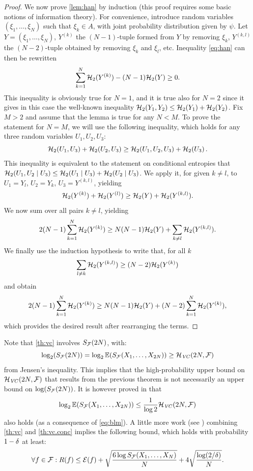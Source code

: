 \begin{proof}
\bigskip
We now prove  \cref{lem:han} by induction (this proof requires some basic notions of information theory). For convenience, introduce random variables $(\xi_1, \ldots, \xi_N)$ such that $\xi_k \in A$, with joint probability distribution given by $\psi$. Let $Y = (\xi_1, \ldots, \xi_N)$, $Y^{(k)}$ the $(N-1)$-tuple formed from $Y$ by removing $\xi_k$, $Y^{(k,l)}$ the $(N-2)$-tuple obtained by removing $\xi_k$ and $\xi_l$, etc. 
Inequality \eqref{eq:han} can then be rewritten
\[
\sum_{k=1}^N  {\mathcal H}_2(Y^{(k)}) - (N-1) {\mathcal H}_2(Y) \geq 0.
\]
This inequality is obviously true for $N=1$, and it is true also for $N=2$ since it gives in this case the well-known inequality ${\mathcal H}_2(Y_1, Y_2) \leq {\mathcal H}_2(Y_1) + {\mathcal H}_2(Y_2)$. 
Fix $M>2$ and assume that the lemma is  true for any $N<M$. To prove the statement for $N = M$, we will use the following inequality, which holds for any three random variables $U_1, U_2, U_3$:
\[
{\mathcal H}_2(U_1, U_3) + {\mathcal H}_2(U_2, U_3) \geq {\mathcal H}_2(U_1, U_2, U_3) + {\mathcal H}_2(U_3)\,.
\]
This inequality is equivalent to the statement on conditional entropies that ${\mathcal H}_2(U_1, U_2\mid U_3) \leq {\mathcal H}_2(U_1\mid U_3) + {\mathcal H}_2(U_2\mid U_3)$. We apply it, for given $k\neq l$, to $U_1 = Y_l$, $U_2 = Y_k$, $U_3 = Y^{(k,l)}$, yielding 
\[
{\mathcal H}_2(Y^{(k)}) + {\mathcal H}_2(Y^{(l)}) \geq {\mathcal H}_2(Y) + {\mathcal H}_2(Y^{(k,l)}).
\]
We now sum over all pairs $k\neq l$, yielding
\[
2(N-1) \sum_{k=1}^N {\mathcal H}_2(Y^{(k)}) \geq N(N-1){\mathcal H}_2(Y) + \sum_{k\neq l} {\mathcal H}_2(Y^{(k,l)}).
\]
 We finally use the induction hypothesis to write that, for all $k$
 \[
 \sum_{l\neq k} {\mathcal H}_2(Y^{(k,l)}) \geq (N-2) {\mathcal H}_2(Y^{(k)})
 \]
  and obtain
\[
2(N-1) \sum_{k=1}^N {\mathcal H}_2(Y^{(k)}) \geq N(N-1){\mathcal H}_2(Y) + (N-2) \sum_{k=1}^N {\mathcal H}_2(Y^{(k)}), 
\]
which provides the desired result after rearranging the terms.
\end{proof}
 

Note that  \cref{th:vc} involves $S_{\mathcal F}(2N)$, with:
\[
\log_2(S_{\mathcal F}(2N)) = \log_2 \bm{\mathbb E}(S_{\mathcal F}(X_1, \ldots, X_{2N})) \geq {\mathcal H}_{\mathit{VC}}(2N, {\mathcal F})
\]
from Jensen's inequality. This implies that the high-probability upper bound on ${\mathcal H}_{\mathit{VC}}(2N, {\mathcal F})$ that results from the previous theorem is not necessarily an upper bound on $\log(S_{\mathcal F}(2N))$. It is however proved in \citet{boucheron2000sharp} that 
\[
\log_2 \bm{\mathbb E}(S_{\mathcal F}(X_1, \ldots, X_{2N})) \leq \frac{1}{\log 2} {\mathcal H}_{\mathit{VC}}(2N, {\mathcal F})
\]
also holds (as a consequence of  \cref{eq:blm}). A little more work (see \citet{boucheron2000sharp}) combining  \cref{th:vc} and \cref{th:vc.conc} implies the following bound, which holds with probability $1-\delta$ at least:
\[
\forall f \in {\mathcal F}: R(f) \leq {\mathcal E}(f) + \sqrt{\frac{6\log S_{\mathcal F}(X_1, \ldots, X_N)}N} + 4 \sqrt{\frac{\log(2/\delta)}N}.
\]


